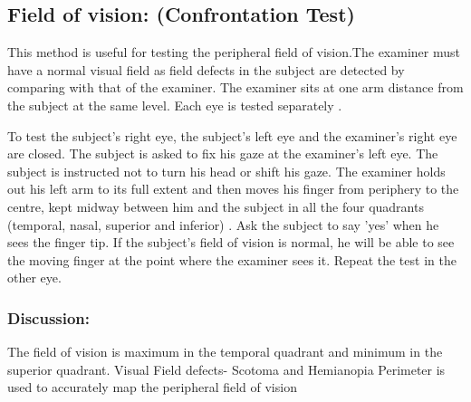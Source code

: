 \documentclass[a4paper,12pt,openany,oneside]{book}
\begin{document}
			\subsection*{Field of vision: (Confrontation Test)}
			This method is useful for testing the peripheral field of vision.The examiner must have a normal visual field as field defects in the subject are detected by comparing with that of the examiner. The examiner sits at one arm distance from the subject at the same level. Each eye is tested separately .
			\par
			To test the subject's right eye, the subject’s left eye and the examiner's right eye are closed. The subject is asked to fix his gaze at the examiner’s left eye. The subject is instructed not to turn his head or shift his gaze. The examiner holds out his left arm to its full extent and then moves his finger from periphery to the centre, kept midway between him and the subject in all the four quadrants (temporal, nasal, superior and inferior) . Ask the subject to say 'yes' when he sees the finger tip. If the subject's field of vision is normal, he will be able to see the moving finger at the point where the examiner sees it. Repeat the test in the other eye.
			\subsubsection*{Discussion:}
			The field of vision is maximum in the temporal quadrant and minimum in the superior quadrant.
			Visual Field defects- Scotoma and Hemianopia
			Perimeter is used to accurately map the peripheral field of vision
\end{document}
